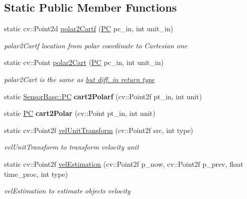 \subsection*{Static Public Member Functions}
\begin{DoxyCompactItemize}
\item 
static cv\+::\+Point2d \hyperlink{class_sensor_base_a9ea2144c7cda85295ba3f8697354a77c}{polar2\+Cartf} (\hyperlink{struct_sensor_base_1_1_p_c}{P\+C} pc\+\_\+in, int unit\+\_\+in)
\begin{DoxyCompactList}\small\item\em polar2\+Cartf location from polar coordinate to Cartesian one \end{DoxyCompactList}\item 
static cv\+::\+Point \hyperlink{class_sensor_base_ab193b852242bb8b85976664518732dfb}{polar2\+Cart} (\hyperlink{struct_sensor_base_1_1_p_c}{P\+C} pc\+\_\+in, int unit\+\_\+in)
\begin{DoxyCompactList}\small\item\em polar2\+Cart is the same as \hyperlink{class_sensor_base_a9ea2144c7cda85295ba3f8697354a77c}{but diff. in return type }\end{DoxyCompactList}\item 
\hypertarget{class_sensor_base_afb3be773547689c4bad57a3847db7e88}{}static \hyperlink{struct_sensor_base_1_1_p_c}{Sensor\+Base\+::\+P\+C} {\bfseries cart2\+Polarf} (cv\+::\+Point2f pt\+\_\+in, int unit)\label{class_sensor_base_afb3be773547689c4bad57a3847db7e88}

\item 
\hypertarget{class_sensor_base_a7a263dfc99be499f8383a64166e6e7f8}{}static \hyperlink{struct_sensor_base_1_1_p_c}{P\+C} {\bfseries cart2\+Polar} (cv\+::\+Point pt\+\_\+in, int unit)\label{class_sensor_base_a7a263dfc99be499f8383a64166e6e7f8}

\item 
static cv\+::\+Point2f \hyperlink{class_sensor_base_acdc1ebb9c7051050bb887118e354b69f}{vel\+Unit\+Transform} (cv\+::\+Point2f src, int type)
\begin{DoxyCompactList}\small\item\em vel\+Unit\+Transform to transform velocity unit \end{DoxyCompactList}\item 
static cv\+::\+Point2f \hyperlink{class_sensor_base_a462a999b17c0217e53fcd7014d271625}{vel\+Estimation} (cv\+::\+Point2f p\+\_\+now, cv\+::\+Point2f p\+\_\+prev, float time\+\_\+proc, int type)
\begin{DoxyCompactList}\small\item\em vel\+Estimation to estimate object\textquotesingle{}s velocity \end{DoxyCompactList}\end{DoxyCompactItemize}


